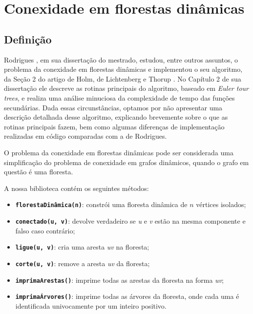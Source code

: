 
\chapter{Conexidade em florestas dinâmicas}

\section{Definição}

Rodrigues \cite{arthur}, em sua dissertação do mestrado, estudou, entre outros assuntos, o problema da conexidade em florestas dinâmicas e implementou o seu algoritmo, da Seção 2 do artigo de Holm, de Lichtenberg e Thorup \cite{jacob_holm}. No Capítulo 2 de sua dissertação ele descreve as rotinas principais do algoritmo, baseado em \textit{Euler tour trees}, e realiza uma análise minuciosa da complexidade de tempo das funções secundárias. Dada essas circunstâncias, optamos por não apresentar uma descrição detalhada desse algoritmo, explicando brevemente sobre o que as rotinas principais fazem, bem como algumas diferenças de implementação realizadas em código comparadas com a de Rodrigues.  

O problema da conexidade em florestas dinâmicas pode ser considerada uma simplificação do problema de conexidade em grafos dinâmicos, quando o grafo em questão é uma floresta. 

A nossa biblioteca contém os seguintes métodos:

\begin{itemize}
    \item \texttt{\textbf{florestaDinâmica(n)}}: constrói uma floresta dinâmica de $n$ vértices isolados;
    \item \texttt{\textbf{conectado(u, v)}}: devolve verdadeiro se \textit{u} e \textit{v} estão na mesma componente e falso caso contrário;
    \item \texttt{\textbf{ligue(u, v)}}: cria uma aresta \textit{uv} na floresta;
    \item \texttt{\textbf{corte(u, v)}}: remove a aresta \textit{uv} da floresta;
    \item \texttt{\textbf{imprimaArestas()}}: imprime todas as arestas da floresta na forma \textit{uv};
    \item \texttt{\textbf{imprimaÁrvores()}}: imprime todas as árvores da floresta, onde cada uma é identificada univocamente por um inteiro positivo.
\end{itemize}


